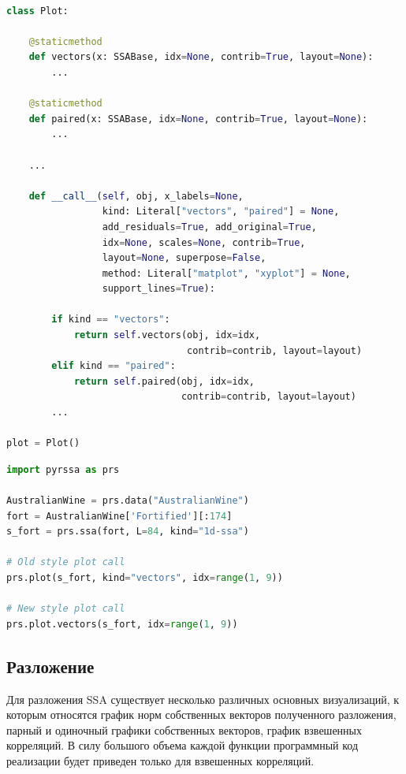 \documentclass[specialist,
			   substylefile = spbu_report.rtx,
			   subf,href,colorlinks=true, 12pt]{disser}
\begin{document}
\begin{lstlisting}[language=Python, caption=Структура для функций визуализации в пакете pyrssa.]

class Plot:

    @staticmethod
    def vectors(x: SSABase, idx=None, contrib=True, layout=None):
        ...
        
    @staticmethod
    def paired(x: SSABase, idx=None, contrib=True, layout=None):
        ...
        
    ...
    
    def __call__(self, obj, x_labels=None,
                 kind: Literal["vectors", "paired"] = None,
                 add_residuals=True, add_original=True,
                 idx=None, scales=None, contrib=True,
                 layout=None, superpose=False,
                 method: Literal["matplot", "xyplot"] = None,
                 support_lines=True):
                 
        if kind == "vectors":
            return self.vectors(obj, idx=idx, 
                                contrib=contrib, layout=layout)
        elif kind == "paired":
            return self.paired(obj, idx=idx, 
                               contrib=contrib, layout=layout)
        ...
        
plot = Plot()
\end{lstlisting}

\begin{lstlisting}[language=Python, caption=Различные возможности обращения к функциям визуализации в Python.]
import pyrssa as prs

AustralianWine = prs.data("AustralianWine")
fort = AustralianWine['Fortified'][:174]
s_fort = prs.ssa(fort, L=84, kind="1d-ssa")

# Old style plot call
prs.plot(s_fort, kind="vectors", idx=range(1, 9))

# New style plot call
prs.plot.vectors(s_fort, idx=range(1, 9))
\end{lstlisting}

\subsection{Разложение}

Для разложения SSA существует несколько различных основных визуализаций, к которым относятся график норм собственных векторов полученного разложения, парный и одиночный графики собственных векторов, график взвешенных корреляций. В силу большого объема каждой функции программный код реализации будет приведен только для взвешенных корреляций.
\end{document}
